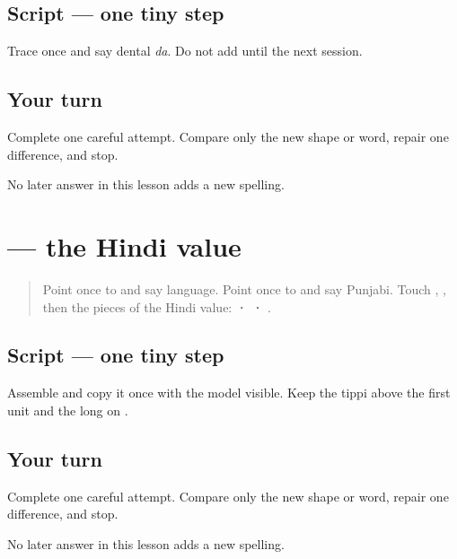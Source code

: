 \subsection*{Script — one tiny step}

Trace \textbf{} once and say dental \emph{da}. Do not add \textbf{} until the next session.

\subsection*{Your turn}
Complete one careful attempt. Compare only the new shape or word, repair one difference, and stop.

\begin{tcolorbox}[breakable,colback=teal!4,colframe=teal!35!black,title={Before you move on}]
No later answer in this lesson adds a new spelling.
\end{tcolorbox}
\section[\texorpdfstring{\pa{ਹਿੰਦੀ} (hindī)}{ਹਿੰਦੀ (hindī)}]{ — the Hindi value}

\label{lesson:PA-W03-hindi}



\begin{quote}
Point once to \textbf{} and say language. Point once to \textbf{} and say Punjabi. Touch \textbf{}, \textbf{}, then the pieces of the Hindi value: \textbf{ ·  · }.
\end{quote}

\subsection*{Script — one tiny step}
Assemble \textbf{} and copy it once with the model visible. Keep the tippi above the first unit and the long \textbf{} on \textbf{}.

\subsection*{Your turn}
Complete one careful attempt. Compare only the new shape or word, repair one difference, and stop.

\begin{tcolorbox}[breakable,colback=teal!4,colframe=teal!35!black,title={Before you move on}]
No later answer in this lesson adds a new spelling.
\end{tcolorbox}
